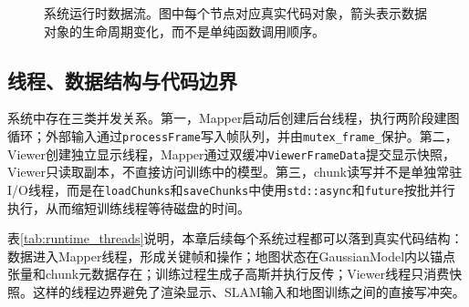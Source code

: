 \begin{figure}[htbp]
\centering
{}
\caption{系统运行时数据流。图中每个节点对应真实代码对象，箭头表示数据对象的生命周期变化，而不是单纯函数调用顺序。}
\label{fig:ch3_runtime_flow}
\end{figure}

\subsection{线程、数据结构与代码边界}

系统中存在三类并发关系。第一，Mapper启动后创建后台线程，执行两阶段建图循环；外部输入通过\texttt{processFrame}写入帧队列，并由\texttt{mutex\_frame\_}保护。第二，Viewer创建独立显示线程，Mapper通过双缓冲\texttt{ViewerFrameData}提交显示快照，Viewer只读取副本，不直接访问训练中的模型。第三，chunk读写并不是单独常驻I/O线程，而是在\texttt{loadChunks}和\texttt{saveChunks}中使用\texttt{std::async}和\texttt{future}按批并行执行，从而缩短训练线程等待磁盘的时间。

表\ref{tab:runtime_threads}说明，本章后续每个系统过程都可以落到真实代码结构：数据进入Mapper线程，形成关键帧和操作；地图状态在GaussianModel内以锚点张量和chunk元数据存在；训练过程生成子高斯并执行反传；Viewer线程只消费快照。这样的线程边界避免了渲染显示、SLAM输入和地图训练之间的直接写冲突。

